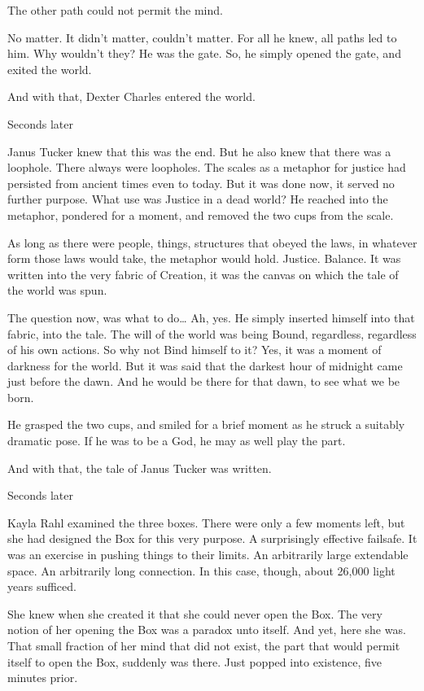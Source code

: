 The other path could not permit the mind.

No matter. It didn’t matter, couldn’t matter. For all he knew, all paths led to him. Why wouldn’t they? He was the gate. So, he simply opened the gate, and exited the world.

And with that, Dexter Charles entered the world.

Seconds later

Janus Tucker knew that this was the end. But he also knew that there was a loophole. There always were loopholes. The scales as a metaphor for justice had persisted from ancient times even to today. But it was done now, it served no further purpose. What use was Justice in a dead world? He reached into the metaphor, pondered for a moment, and removed the two cups from the scale.

As long as there were people, things, structures that obeyed the laws, in whatever form those laws would take, the metaphor would hold. Justice. Balance. It was written into the very fabric of Creation, it was the canvas on which the tale of the world was spun.

The question now, was what to do… Ah, yes. He simply inserted himself into that fabric, into the tale. The will of the world was being Bound, regardless, regardless of his own actions. So why not Bind himself to it? Yes, it was a moment of darkness for the world. But it was said that the darkest hour of midnight came just before the dawn. And he would be there for that dawn, to see what we be born.

He grasped the two cups, and smiled for a brief moment as he struck a suitably dramatic pose. If he was to be a God, he may as well play the part.

And with that, the tale of Janus Tucker was written.

Seconds later

Kayla Rahl examined the three boxes. There were only a few moments left, but she had designed the Box for this very purpose. A surprisingly effective failsafe. It was an exercise in pushing things to their limits. An arbitrarily large extendable space. An arbitrarily long connection. In this case, though, about 26,000 light years sufficed.

She knew when she created it that she could never open the Box. The very notion of her opening the Box was a paradox unto itself. And yet, here she was. That small fraction of her mind that did not exist, the part that would permit itself to open the Box, suddenly was there. Just popped into existence, five minutes prior.

